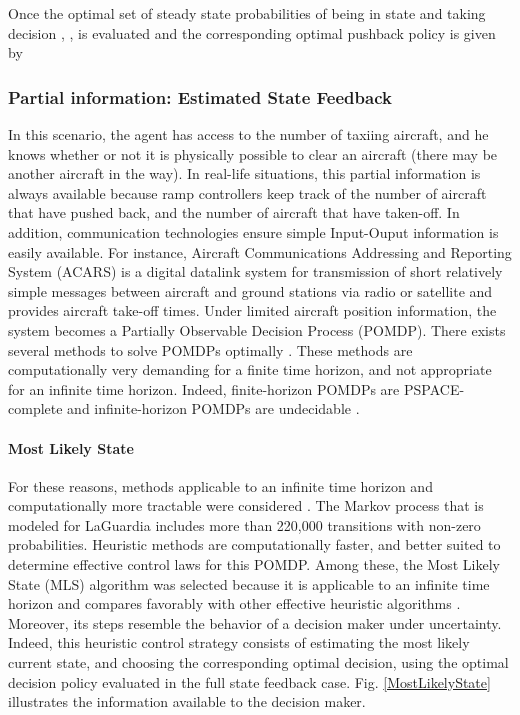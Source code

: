 \documentclass[letterpaper]{article}
\begin{document}
Once the optimal set of steady state probabilities of being in state  and taking decision , , is evaluated and the corresponding 
optimal pushback policy is given by




\subsubsection{Partial information: Estimated State Feedback} \label{partial}

In this scenario, the agent has access to the number of taxiing aircraft, and he knows whether or not it is physically possible to clear an 
aircraft (there may be another aircraft in the way). In real-life situations, this partial information is always available because ramp 
controllers keep track of the number of aircraft that have pushed back, and the number of aircraft that have taken-off.
 In addition, communication technologies ensure simple Input-Ouput information is easily available. For instance, Aircraft Communications 
 Addressing and Reporting System (ACARS) is a digital datalink system for transmission of short relatively simple messages between aircraft 
 and ground stations via radio or satellite and provides aircraft take-off times.
  Under limited aircraft position information, the system becomes a Partially Observable Decision Process (POMDP). There exists several methods
   to solve POMDPs optimally \cite{Cassandra1996,Cassandra1997,Sondik1971,Kaelbling1998}.
  These methods are computationally very demanding for a finite time horizon, and not appropriate for an infinite time horizon. Indeed, finite-horizon 
  POMDPs are PSPACE-complete \cite{Papadimitriou1987} and infinite-horizon POMDPs are undecidable \cite{Madani1999}.

\paragraph{Most Likely State}

For these reasons, methods applicable to an infinite time horizon and computationally more tractable were considered \cite{Cassandra1996}. 
The Markov process that is modeled for LaGuardia includes more than 220,000 transitions with non-zero probabilities. 
Heuristic methods are computationally faster, and better suited to determine effective control laws for this POMDP.
 Among these, the Most Likely State (MLS) algorithm was selected because it is applicable to an infinite time horizon and 
 compares favorably with other effective heuristic algorithms \cite{Cassandra1996}. 
 Moreover, its steps resemble the behavior of a decision maker under uncertainty. 
 Indeed, this heuristic control strategy consists of estimating the most likely current state, and choosing the corresponding optimal decision, using the optimal decision policy evaluated in the full state feedback case. Fig. \ref{MostLikelyState} illustrates the information available to the decision maker.\\
\end{document}
